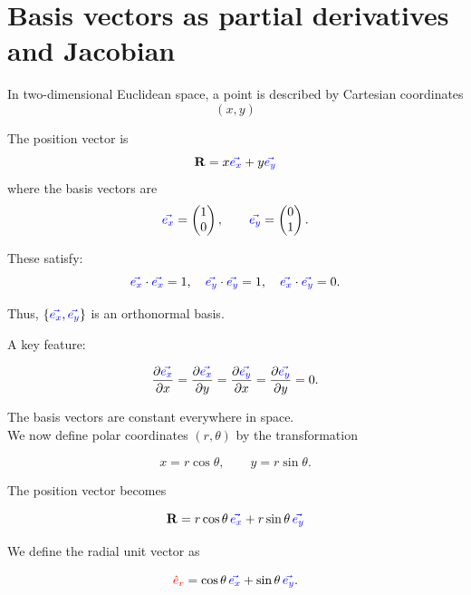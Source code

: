 \section{Basis vectors as partial derivatives and Jacobian}

In two-dimensional Euclidean space, a point is described by Cartesian coordinates
\[
(x,y)
\]

The position vector is
\[
\mathbf{R} = x \begingroup\color{blue}\vec{e_x}\endgroup + y \begingroup\color{blue}\vec{e_y}\endgroup
\]
where the basis vectors are
\[
\begingroup\color{blue}\vec{e_x}\endgroup = \begin{pmatrix}1 \\ 0\end{pmatrix},
\qquad
\begingroup\color{blue}\vec{e_y}\endgroup = \begin{pmatrix}0 \\ 1\end{pmatrix}.
\]

These satisfy:
\[
\begingroup\color{blue}\vec{e_x}\endgroup \cdot \begingroup\color{blue}\vec{e_x}\endgroup = 1, 
\quad
\begingroup\color{blue}\vec{e_y}\endgroup \cdot \begingroup\color{blue}\vec{e_y}\endgroup = 1,
\quad
\begingroup\color{blue}\vec{e_x}\endgroup \cdot \begingroup\color{blue}\vec{e_y}\endgroup = 0.
\]

Thus, $\{\begingroup\color{blue}\vec{e_x}\endgroup, \begingroup\color{blue}\vec{e_y}\endgroup\}$ is an orthonormal basis.

A key feature:

\[
\frac{\partial \begingroup\color{blue}\vec{e_x}\endgroup}{\partial x} = 
\frac{\partial \begingroup\color{blue}\vec{e_x}\endgroup}{\partial y} =
\frac{\partial \begingroup\color{blue}\vec{e_y}\endgroup}{\partial x} =
\frac{\partial \begingroup\color{blue}\vec{e_y}\endgroup}{\partial y} = 0.
\]

The basis vectors are constant everywhere in space.\\

We now define polar coordinates $(r,\theta)$ by the transformation

\[
x = r \cos\theta,
\qquad
y = r \sin\theta.
\]

The position vector becomes

\[
\mathbf{R} = r\cos\theta \,\begingroup\color{blue}\vec{e_x}\endgroup + r\sin\theta \,\begingroup\color{blue}\vec{e_y}\endgroup
\]

We define the radial unit vector as

\[
\begingroup\color{red}\hat{e}_r\endgroup
= \cos\theta \,\begingroup\color{blue}\vec{e_x}\endgroup 
+ \sin\theta \,\begingroup\color{blue}\vec{e_y}\endgroup.
\]

